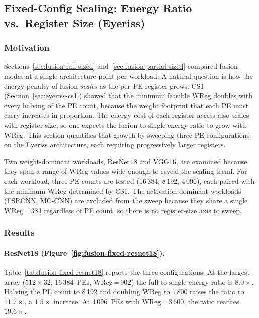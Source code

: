 \subsection{Fixed-Config Scaling: Energy Ratio vs.\ Register Size
  (Eyeriss)}
\label{sec:fusion-fixed-scaling}

\subsubsection{Motivation}

Sections~\ref{sec:fusion-full-sized} and~\ref{sec:fusion-partial-sized}
compared fusion modes at a single architecture point per workload.
A natural question is how the energy penalty of fusion \emph{scales}
as the per-PE register grows.
CS1 (Section~\ref{sec:eyeriss-cs1}) showed that the minimum feasible
WReg doubles with every halving of the PE count, because the
weight footprint that each PE must carry increases in proportion.
The energy cost of each register access also scales with register
size, so one expects the fusion-to-single energy ratio to grow
with WReg.
This section quantifies that growth by sweeping three PE
configurations on the Eyeriss architecture, each requiring
progressively larger registers.

Two weight-dominant workloads, ResNet18 and VGG16, are examined
because they span a range of WReg values wide enough to reveal
the scaling trend.
For each workload, three PE counts are tested
(16\,384, 8\,192, 4\,096), each paired with the minimum WReg
determined by CS1.
The activation-dominant workloads (FSRCNN, MC-CNN) are excluded
from the sweep because they share a single WReg\,=\,384
regardless of PE count, so there is no register-size axis to
sweep.

\subsubsection{Results}

\paragraph{ResNet18 (Figure~\ref{fig:fusion-fixed-resnet18}).}
Table~\ref{tab:fusion-fixed-resnet18} reports the three
configurations.
At the largest array ($512 \times 32$, 16\,384~PEs, WReg\,=\,902)
the full-to-single energy ratio is $8.0\times$.
Halving the PE count to 8\,192 and doubling WReg to 1\,800
raises the ratio to $11.7\times$, a $1.5\times$ increase.
At 4\,096~PEs with WReg\,=\,3\,600, the ratio reaches
$19.6\times$.

